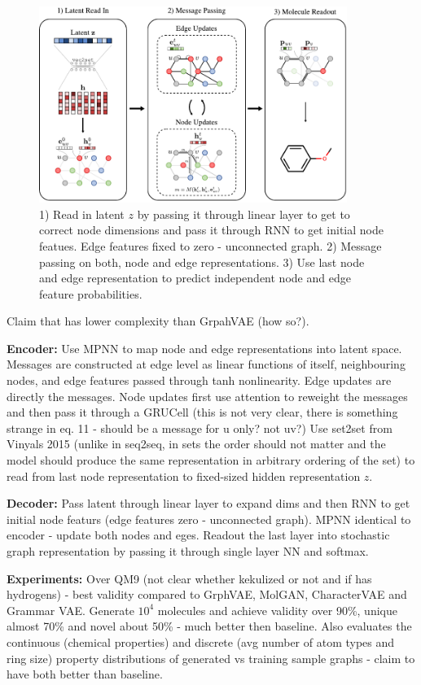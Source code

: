 \begin{figure}[ht]
\centering
\includegraphics[width=10cm]{mpgvae_figure1.png}
\caption{1) Read in latent $z$ by passing it through linear layer to get to correct node dimensions and pass it through RNN to get initial node featues. Edge features fixed to zero - unconnected graph. 2) Message passing on both, node and edge representations. 3) Use last node and edge representation to predict independent node and edge feature probabilities.}
\end{figure}

Claim that has lower complexity than GrpahVAE (how so?).

\textbf{Encoder:} Use MPNN to map node and edge representations into latent space.
Messages are constructed at edge level as linear functions of itself, neighbouring nodes, and edge features passed through tanh nonlinearity.
Edge updates are directly the messages. 
Node updates first use attention to reweight the messages and then pass it through a GRUCell (this is not very clear, there is something strange in eq. 11 - should be a message for u only? not uv?)
Use set2set from Vinyals 2015 (unlike in seq2seq, in sets the order should not matter and the model should produce the same representation in arbitrary ordering of the set) to read from last node representation to fixed-sized hidden representation $z$.

\textbf{Decoder:} Pass latent through linear layer to expand dims and then RNN to get initial node featurs (edge features zero - unconnected graph). MPNN identical to encoder - update both nodes and eges.
Readout the last layer into stochastic graph representation by passing it through single layer NN and softmax.

\textbf{Experiments:} Over QM9 (not clear whether kekulized or not and if has hydrogens) - best validity compared to GrphVAE, MolGAN, CharacterVAE and Grammar VAE. Generate $10^4$ molecules and achieve validity over 90\%, unique almost 70\% and novel about 50\% - much better then baseline. 
Also evaluates the continuous (chemical properties) and discrete (avg number of atom types and ring size) property distributions of generated vs training sample graphs - claim to have both better than baseline.



